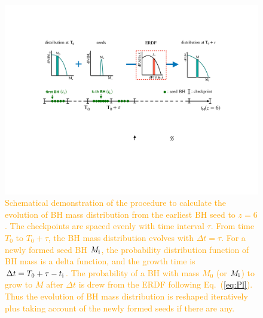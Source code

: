 \documentclass[twocolumn, twocolappendix]{aastex63}
\newcommand{\Mh}{M_\mathrm{h}}
\newcommand{\orange}[1]{\textcolor{orange}{ #1}}
\begin{document}
\begin{CJK*}{UTF8}{gbsn}
\begin{figure}
\centering
\includegraphics[width=170mm]{scheme1.pdf}
\caption{\orange{
Schematical demonstration of the procedure to calculate the evolution of BH mass distribution from the earliest BH seed to $z=6$.
The checkpoints are spaced evenly with time interval $\tau$.
From time $T_0$ to $T_0+\tau$, 
the BH mass distribution evolves with $\Delta t=\tau$.
For a newly formed seed BH $M_{\rm i}$, the probability distribution function of BH mass is a delta function, 
and the growth time is $\Delta t = T_0+\tau-t_{\rm i}$.
The probability of a BH with mass $M_0$ (or $M_{\rm i}$) to grow to $M$ after $\Delta t$ is drew from the 
ERDF following Eq.~(\ref{eq:Pl}). 
Thus the evolution of BH mass distribution is reshaped iteratively 
plus taking account of the newly formed seeds if there are any.}
}
\label{fig:scheme}
\vspace{5mm}
\end{figure}



\vspace{2mm}




\end{CJK*}
\end{document}
